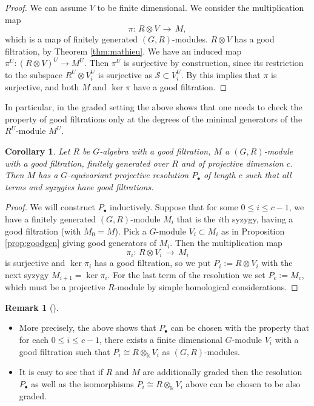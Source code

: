 \documentclass[11pt]{amsart}
\numberwithin{equation}{section}
\newtheorem{corollary}[equation]{Corollary}
\theoremstyle{definition}
\newtheorem{rmk}[equation]{Remark}
\newenvironment{remark}[1][]{\begin{rmk}[#1] \pushQED{\qed}}{\popQED \end{rmk}}
\newcommand{\oo}{\otimes}
\newcommand{\mc}{\mathcal}
\newcommand{\kk}{\Bbbk}
\begin{document}
\begin{proof}
We can assume $V$ to be finite dimensional. We consider the multiplication map
\[ \pi: \, R \oo V \, \rightarrow \, M, \]
which is a map of finitely generated $(G,R)$-modules. $R \oo V$ has a good filtration, by Theorem \ref{thm:mathieu}. We have an induced map $\pi^U:  (R \oo V)^U \rightarrow M^U$. Then $\pi^U$ is surjective by construction, since its restriction to the subspace $R^U \oo V_i^U$ is surjective as $\mc{S} \subset V_i^U$. By \cite[Lemma 2.11]{me} this implies that $\pi$ is surjective, and both $M$ and $\ker \pi$ have a good filtration.
\end{proof}

In particular, in the graded setting the above shows that one needs to check the property of good filtrations only at the degrees of the minimal generators of the $R^U$-module $M^U$.


\begin{corollary}\label{cor:res}
Let $R$ be $G$-algebra with a good filtration, $M$ a $(G,R)$-module with a good filtration, finitely generated over $R$ and of projective dimension $c$. Then $M$ has a $G$-equivariant projective resolution $P_\bullet$ of length $c$ such that all terms and syzygies have good filtrations.
\end{corollary}

\begin{proof}
We will construct $P_\bullet$ inductively. Suppose that for some $0\leq i \leq c-1$, we have a finitely generated $(G,R)$-module $M_i$ that is the $i$th syzygy, having a good filtration (with $M_0=M$). Pick a $G$-module $V_i \subset M_i$ as in Proposition \ref{prop:goodgen} giving good generators of $M_i$. Then the multiplication map
\[ \pi_i: \, R \oo V_i \, \rightarrow \, M_i\]
is surjective and $\ker \pi_i$ has a good filtration, so we put $P_i:=R \oo V_i$ with the next syzygy $M_{i+1} = \ker \pi_i$. For the last term of the resolution we set $P_c:=M_c$, which must be a projective $R$-module by simple homological considerations.
\end{proof}

\begin{remark}\label{rem:res}
\begin{itemize}
\item[(a)] More precisely, the above shows that $P_\bullet$ can be chosen with the property that for each $0\leq i \leq c-1$, there exists a finite dimensional $G$-module $V_i$ with a good filtration such that $P_i \cong R \oo_{\kk} V_i$ as $(G,R)$-modules.
\item[(b)] It is easy to see that if $R$ and $M$ are additionally graded then the resolution $P_\bullet$ as well as the isomorphisms $P_i \cong R \oo_{\kk} V_i$ above can be chosen to be also graded.
\end{itemize}
\end{remark}
\end{document}
